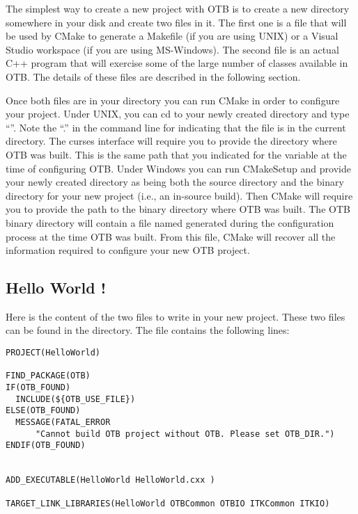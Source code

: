 The simplest way to create a new project with OTB is to create a new directory
somewhere in your disk and create two files in it. The first one is a
 file that will be used by CMake to generate a Makefile
(if you are using UNIX) or a Visual Studio workspace (if you are using
MS-Windows).  The second file is an actual C++ program that will exercise
some of the large number of classes available in OTB. The details of these files
are described in the following section.

Once both files are in your directory you can run CMake in order to configure
your project. Under UNIX, you can cd to your newly created directory
and type ``''. Note the ``.'' in the command line for indicating
that the  file is in the current directory. The
curses interface will require you to provide the directory where OTB
was built. This is the same path that you indicated for the
 variable at the time of configuring OTB. Under
Windows you can run CMakeSetup and provide your newly created
directory as being both the source directory and the binary directory for
your new project (i.e., an in-source build). Then CMake will require you to
provide the path to the binary directory where OTB was built. The OTB binary
directory will contain a file named  generated during the
configuration process at the time OTB was built.  From this file, CMake will
recover all the information required to configure your new OTB project.


\subsection{Hello World !}
\label{sec:HelloWorldOTB}


Here is the content of the two files to write in your new project. These two
files can be found in the  directory. The
 file contains the following lines:

\small
\begin{verbatim}
PROJECT(HelloWorld)

FIND_PACKAGE(OTB)
IF(OTB_FOUND)
  INCLUDE(${OTB_USE_FILE})
ELSE(OTB_FOUND)
  MESSAGE(FATAL_ERROR
      "Cannot build OTB project without OTB. Please set OTB_DIR.")
ENDIF(OTB_FOUND)


ADD_EXECUTABLE(HelloWorld HelloWorld.cxx )

TARGET_LINK_LIBRARIES(HelloWorld OTBCommon OTBIO ITKCommon ITKIO)
\end{verbatim}

